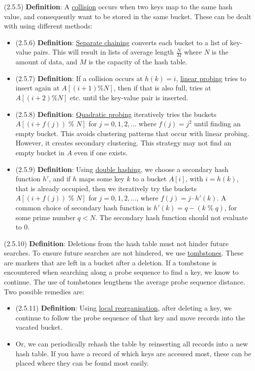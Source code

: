 \documentclass{article}
\newcommand{\separate}[1] {\vspace{#1 pt}\noindent}
\newcommand{\definition}[2]{(#1) \textbf{Definition}: #2}
\begin{document}
\separate{5}\definition{2.5.5}{A \underline{collision} occurs when two keys map to the same hash value, and consequently want to be stored in the same bucket. These can be dealt with using different methods:}
\begin{itemize}
    \item \definition{2.5.6}{\underline{Separate chaining} converts each bucket to a list of key-value pairs. This will result in lists of average length \(\frac{N}{M}\) where \(N\) is the amount of data, and \(M\) is the capacity of the hash table.}
    \item \definition{2.5.7}{If a collision occurs at \(h(k)=i\), \underline{linear probing} tries to insert again at \(A[(i+1)\%N]\), then if that is also full, tries at \(A[(i+2)\%N]\) etc. until the key-value pair is inserted.}
    \item \definition{2.5.8}{\underline{Quadratic probing} iteratively tries the buckets \(A[(i+f(j)) \; \% \; N]\) for \(j=0,1,2,...\) where \(f(j)=j^2\) until finding an empty bucket. This avoids clustering patterns that occur with linear probing. However, it creates secondary clustering. This strategy may not find an empty bucket in $A$ even if one exists.}
    \item \definition{2.5.9}{Using \underline{double hashing}, we choose a secondary hash function $h'$, and if $h$ maps some key $k$ to a bucket $A[i]$, with $i=h(k)$, that is already occupied, then we iteratively try the buckets $A[(i+f(j)) \; \% \; N]$ for $j=0,1,2,...$, where $f(j)=j \cdot h'(k)$. A common choice of secondary hash function is $h'(k)=q-(k \; \% \; q)$, for some prime number $q<N$. The secondary hash function should not evaluate to 0. }
\end{itemize}
\definition{2.5.10}{Deletions from the hash table must not hinder future searches. To ensure future searches are not hindered, we use \underline{tombstones}. These are markers that are left in a bucket after a deletion. If a tombstone is encountered when searching along a probe sequence to find a key, we know to continue. The use of tombstones lengthens the average probe sequence distance. Two possible remedies are:}
\begin{itemize}
    \item \definition{2.5.11}{Using \underline{local reorganisation}, after deleting a key, we continue to follow the probe sequence of that key and move records into the vacated bucket.} 
    \item Or, we can periodically rehash the table by reinserting all records into a new hash table. If you have a record of which keys are accessed most, these can be placed where they can be found most easily. 
\end{itemize}
\end{document}
